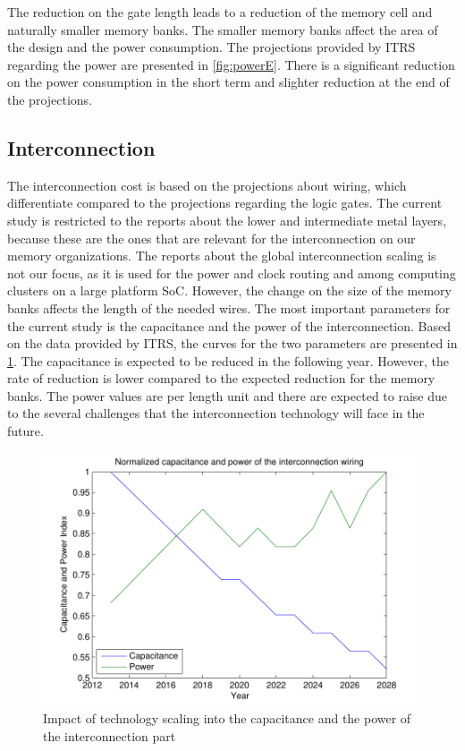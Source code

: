 The reduction on the gate length leads to a reduction of the memory cell and naturally smaller memory banks.
The smaller memory banks affect the area of the design and the power consumption.
The projections provided by ITRS regarding the power are presented in \ref{fig:powerE}. 
There is a significant reduction on the power consumption in the short term and slighter reduction at the end of the projections.

\subsection{Interconnection}

The interconnection cost is based on the projections about wiring, which differentiate compared to the projections regarding the logic gates.
The current study is restricted to the reports about the lower and intermediate metal layers, because these are the ones that are relevant for the interconnection on our memory organizations.
The reports about the global interconnection scaling is not our focus, as it is used for the power and clock routing and among computing clusters on a large platform SoC.
However, the change on the size of the memory banks affects the length of the needed wires.
The most important parameters for the current study is the capacitance and the power of the interconnection.
Based on the data provided by ITRS, the curves for the two parameters are presented in \ref{fig:intpowerE}.
The capacitance is expected to be reduced in the following year.
However, the rate of reduction is lower compared to the expected reduction for the memory banks.
The power values are per length unit and there are expected to raise due to the several challenges that the interconnection technology will face in the future.

 \begin{figure}
 \centering
 \includegraphics[width = \textwidth]{E/intpower.pdf}
  \caption{Impact of technology scaling into the capacitance and the power of the interconnection part}
 \label{fig:intpowerE}
 \end{figure}

